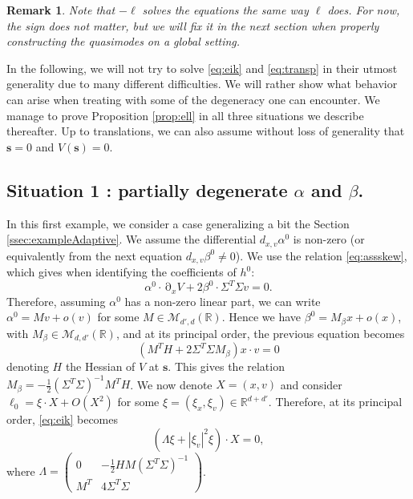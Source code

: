 \documentclass[12pt]{amsart}
\newcommand{\R}{\mathbb R}
\numberwithin{equation}{section}
\numberwithin{figure}{section}
\def\s{\mathbf{s}}
\DeclareMathOperator{\p}{\partial}
\newtheorem{remark}[defin]{Remark}
\def\Mr{{\mathscr M}}\def\Nr{{\mathscr N}}\def\Or{{\mathscr O}}\def\Pr{{\mathscr P}}
\begin{document}
\begin{remark}\label{rem:signell}
    Note that $-\ell$ solves the equations the same way $\ell$ does. For now, the sign does not matter, but we will fix it in the next section when properly constructing the quasimodes on a global setting.
\end{remark}

In the following, we will not try to solve \eqref{eq:eik} and \eqref{eq:transp} in their utmost generality due to many different difficulties. We will rather show what behavior can arise when treating with some of the degeneracy one can encounter. We manage to prove Proposition \ref{prop:ell} in all three situations we describe thereafter. Up to translations, we can also assume without loss of generality that $\s = 0$ and $V(\s) = 0$.










\subsection{Situation 1 : partially degenerate $\alpha$ and $\beta$.}\label{sub:ex1geo}

In this first example, we consider a case generalizing a bit the Section \ref{ssec:exampleAdaptive}. We assume the differential $d_{x,v}\alpha^0$ is non-zero (or equivalently from the next equation $d_{x,v}\beta^0\neq0$). We use the relation \eqref{eq:assskew}, which gives when identifying the coefficients of $h^0$:
\begin{equation*}
\alpha^0\cdot\p_xV + 2\beta^0\cdot\Sigma^T\Sigma v = 0.
\end{equation*}
Therefore, assuming $\alpha^0$ has a non-zero linear part, we can write $\alpha^0 = Mv + o(v)$ for some $M\in\Mr_{d',d}(\R)$. Hence we have $\beta^0 = M_\beta x + o(x)$, with $M_\beta\in\Mr_{d,d'}(\R)$, and at its principal order, the previous equation becomes
\begin{equation*}
(M^TH + 2\Sigma^T\Sigma M_\beta)x\cdot v = 0
\end{equation*}
denoting $H$ the Hessian of $V$ at $\s$. This gives the relation $M_\beta = -\frac12(\Sigma^T\Sigma )^{-1}M^TH$. We now denote $X = (x,v)$ and consider $\ell_0 = \xi\cdot X + O(X^2)$ for some $\xi=(\xi_x,\xi_v)\in\R^{d+d'}$. Therefore, at its principal order, \eqref{eq:eik} becomes
\begin{equation}\label{eq:eik1}
(\Lambda\xi + |\xi_v|^2\xi)\cdot X = 0,
\end{equation}
where $\Lambda = \begin{pmatrix}
    0&-\frac12HM(\Sigma^T\Sigma)^{-1}\\
    M^T&4\Sigma^T\Sigma
\end{pmatrix}$.
\end{document}
